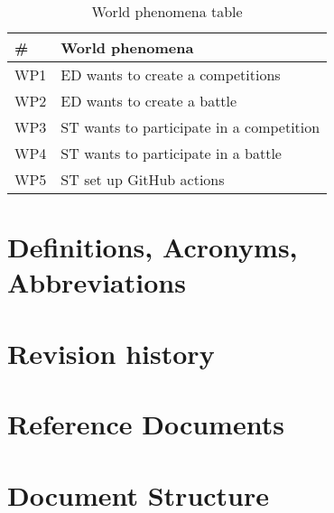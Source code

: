 \begin{table}[H]
  \begin{tabular}{|l|l|}

    \hline
    \textbf{\#} & \textbf{World phenomena}      \\
    \hline
    WP1 & ED wants to create a competitions \\
    \hline
    WP2 & ED wants to create a battle \\
    \hline
    WP3 & ST wants to participate in a competition \\
    \hline
    WP4 & ST wants to participate in a battle     \\
    \hline
    WP5 & ST set up GitHub actions    \\
    \hline
  \end{tabular}
  \caption{World phenomena table}
  \label{tab:simple}
\end{table}


\section{Definitions, Acronyms, Abbreviations}
\label{s:Definitions_Acronyms_Abbreviations}%

\section{Revision history}
\label{s:Revision_history}%


\section{Reference Documents}
\label{s:Reference_documents}%

\section{Document Structure}
\label{s:Document_Structure}%

